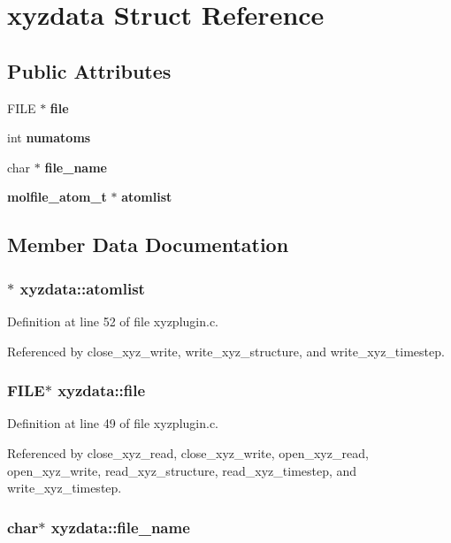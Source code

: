 \section{xyzdata  Struct Reference}
\label{structxyzdata}
\subsection*{Public Attributes}
\begin{CompactItemize}
\item 
FILE $\ast$ {\bf file}
\item 
int {\bf numatoms}
\item 
char $\ast$ {\bf file\_\-name}
\item 
{\bf molfile\_\-atom\_\-t} $\ast$ {\bf atomlist}
\end{CompactItemize}


\subsection{Member Data Documentation}
\subsubsection{$\ast$ xyzdata::atomlist}\label{structxyzdata_m3}




Definition at line 52 of file xyzplugin.c.

Referenced by close\_\-xyz\_\-write, write\_\-xyz\_\-structure, and write\_\-xyz\_\-timestep.
\subsubsection{\setlength{\rightskip}{0pt plus 5cm}FILE$\ast$ xyzdata::file}\label{structxyzdata_m0}




Definition at line 49 of file xyzplugin.c.

Referenced by close\_\-xyz\_\-read, close\_\-xyz\_\-write, open\_\-xyz\_\-read, open\_\-xyz\_\-write, read\_\-xyz\_\-structure, read\_\-xyz\_\-timestep, and write\_\-xyz\_\-timestep.
\subsubsection{\setlength{\rightskip}{0pt plus 5cm}char$\ast$ xyzdata::file\_\-name}\label{structxyzdata_m2}




